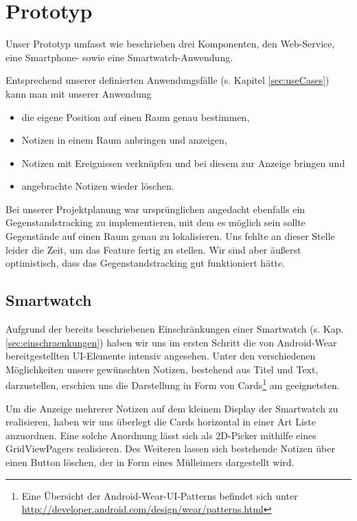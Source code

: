 \section{Prototyp}
\label{sec:prototyp}
Unser Prototyp umfasst wie beschrieben drei Komponenten, den Web-Service, eine Smartphone- sowie eine Smartwatch-Anwendung. 

Entsprechend unserer definierten Anwendungsfälle (s. Kapitel \ref{sec:useCases}) kann man mit unserer Anwendung
\begin{itemize}
\item{die eigene Position auf einen Raum genau bestimmen,}
\item{Notizen in einem Raum anbringen und anzeigen,}
\item{Notizen mit Ereignissen verknüpfen und bei diesem zur Anzeige bringen und}
\item{angebrachte Notizen wieder löschen.} 
\end{itemize}

Bei unserer Projektplanung war ursprünglichen angedacht ebenfalls ein Gegenstands\-tracking zu implementieren, mit dem es möglich sein sollte Gegenstände auf einen Raum genau zu lokalisieren. Uns fehlte an dieser Stelle leider die Zeit, um das Feature fertig zu stellen. Wir sind aber äußerst optimistisch, dass das Gegenstandstracking gut funktioniert hätte.

\subsection{Smartwatch}

Aufgrund der bereits beschriebenen Einschränkungen einer Smartwatch (s. Kap. \ref{sec:einschraenkungen}) haben wir uns im ersten Schritt die von Android-Wear bereitgestellten UI-Elemente intensiv angesehen. Unter den verschiedenen Möglichkeiten unsere gewünschten Notizen, bestehend aus Titel und Text, darzustellen, erschien uns die Darstellung in Form von Cards\footnote{Eine Übersicht der Android-Wear-UI-Patterns befindet sich unter \url{http://developer.android.com/design/wear/patterns.html}} am geeignetsten.

Um die Anzeige mehrerer Notizen auf dem kleinem Display der Smartwatch zu realisieren, haben wir uns überlegt die Cards horizontal in einer Art Liste anzuordnen. Eine solche Anordnung lässt sich als 2D-Picker mithilfe eines GridViewPagers realisieren. Des Weiteren lassen sich bestehende Notizen über einen Button löschen, der in Form eines Mülleimers dargestellt wird. 

